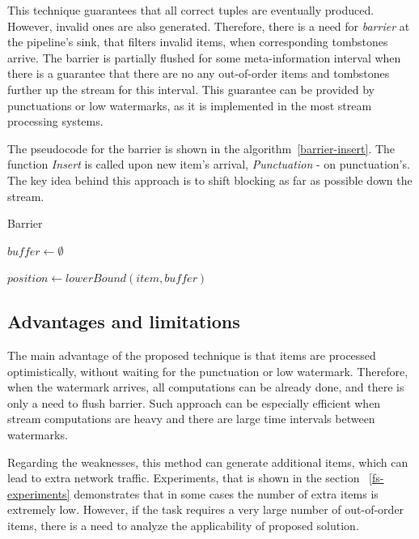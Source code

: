 This technique guarantees that all correct tuples are eventually produced. However, invalid ones are also generated. Therefore, there is a need for {\it barrier} at the pipeline's sink, that filters invalid items, when corresponding tombstones arrive. The barrier is partially flushed for some meta-information interval when there is a guarantee that there are no any out-of-order items and tombstones further up the stream for this interval. This guarantee can be provided by punctuations or low watermarks, as it is implemented in the most stream processing systems. 

The pseudocode for the barrier is shown in the algorithm~\ref{barrier-insert}. The function {\it Insert} is called upon new item's arrival, {\it Punctuation} - on punctuation's. The key idea behind this approach is to shift blocking as far as possible down the stream.

\begin{algorithm}
\caption{Barrier}
\label{barrier-insert}
  \begin{algorithmic}[1]
    \State $buffer \gets \emptyset$

    \State

      \State $position \gets lowerBound(item, buffer)$
        \State {}
      \Else
        \State {}
      \EndIf
    \EndFunction

    \State

        \State {}
        \State {}
      \EndFor
    \EndFunction
  \end{algorithmic}
\end{algorithm}

\subsection{Advantages and limitations}
The main advantage of the proposed technique is that items are processed optimistically, without waiting for the punctuation or low watermark. Therefore, when the watermark arrives, all computations can be already done, and there is only a need to flush barrier. Such approach can be especially efficient when stream computations are heavy and there are large time intervals between watermarks.

Regarding the weaknesses, this method can generate additional items, which can lead to extra network traffic. Experiments, that is shown in the section ~\ref{fs-experiments} demonstrates that in some cases the number of extra items is extremely low. However, if the task requires a very large number of out-of-order items, there is a need to analyze the applicability of proposed solution.


